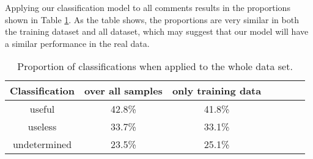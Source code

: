 Applying our classification model to all comments results in the proportions shown in Table \ref{tb:percent}.
As the table shows, the proportions are very similar in both the training dataset and all dataset,
which may suggest that our model will have a similar performance in the real data.

\begin{table}[!t]
\caption{Proportion of classifications when applied to the whole data set.}
\small
\centering
\def\arraystretch{1.2}
\begin{tabular}{ccccccc}
\hline
Classification & over all samples & only training data  \\ \hline
useful &            42.8\%      &      41.8\%         \\
useless &           33.7\%      &      33.1\%         \\
undetermined &      23.5\%      &      25.1\%         \\ \hline
\end{tabular}
\label{tb:percent}
\end{table}


















